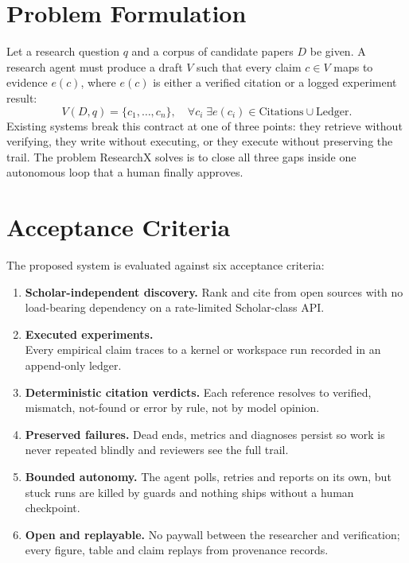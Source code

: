 \documentclass[12pt,a4paper]{report}
\numberwithin{equation}{chapter}
\begin{document}
\section{Problem Formulation}
Let a research question $q$ and a corpus of candidate papers $D$ be given. A
research agent must produce a draft $V$ such that every claim $c \in V$ maps
to evidence $e(c)$, where $e(c)$ is either a verified citation or a logged
experiment result:
\begin{equation}
V(D, q) = \{c_1, \dots, c_n\}, \quad \forall c_i \; \exists e(c_i) \in \mathrm{Citations} \cup \mathrm{Ledger}.
\end{equation}
Existing systems break this contract at one of three points: they retrieve
without verifying, they write without executing, or they execute without
preserving the trail. The problem ResearchX solves is to close all three
gaps inside one autonomous loop that a human finally approves.

\section{Acceptance Criteria}
The proposed system is evaluated against six acceptance criteria:
\begin{enumerate}
\item \textbf{Scholar-independent discovery.} Rank and cite from open sources
with no load-bearing dependency on a rate-limited Scholar-class API.
\item \textbf{Executed experiments.}\\
Every empirical claim
traces to a kernel or workspace run recorded in an append-only ledger.
\item \textbf{Deterministic citation verdicts.} Each reference resolves to
verified, mismatch, not-found or error by rule, not by model opinion.
\item \textbf{Preserved failures.} Dead ends, metrics and diagnoses persist
so work is never repeated blindly and reviewers see the full trail.
\item \textbf{Bounded autonomy.} The agent polls, retries and reports on its
own, but stuck runs are killed by guards and nothing ships without a human
checkpoint.
\item \textbf{Open and replayable.} No paywall between the researcher and
verification; every figure, table and claim replays from provenance records.
\end{enumerate}

\end{document}
